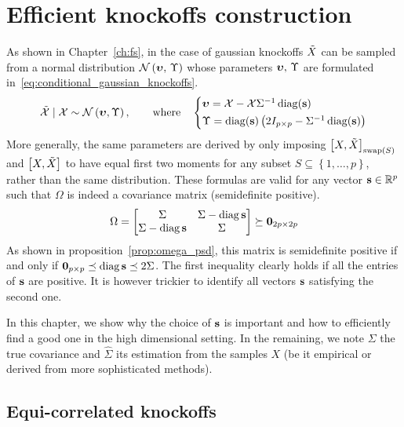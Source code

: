 \chapter{Efficient knockoffs construction}\label{ch:sdp}

As shown in Chapter~\ref{ch:fs}, in the case of gaussian knockoffs
$\tilde{X}$ can be sampled from a normal distribution $\mathcal{N}\left( \bm{\upsilon},\, \Upsilon \right)$ whose parameters
$\bm{\upsilon},\, \Upsilon$ are formulated in~\ref{eq:conditional_gaussian_knockoffs}.
\begin{equation}\label{eq:conditional_gaussian_knockoffs}
    \tcX \mid \cX \sim \cN\left( \bupsilon, \Upsilon \right)
    ,\qquad\text{where}\quad
    \begin{cases*}
        \bupsilon = \cX - \cX\Sigma^{-1}\diag(\bs)\\
        \Upsilon = \diag(\bs)\left( 2I_{p \times p} - \Sigma^{-1}\diag(\bs) \right)
    \end{cases*}
\end{equation}
More generally, the same parameters are derived by only imposing
$\big[ X, \tilde{X} \big]_{\operatorname{swap}\left( S \right)}$ and $\big[ X, \tilde{X} \big]$
to have equal first two moments
for any subset
$S \subseteq \left\{ 1, \dots, p \right\}$,
rather than the same distribution.
These formulas are valid for any vector $\mathbf{s} \in \mathbb{R}^p$ such that $\Omega$
is indeed a covariance matrix (semidefinite positive).
\begin{equation*}
    \Omega = \begin{bmatrix}
        \Sigma & \Sigma - \operatorname*{diag} \mathbf{s}\\
        \Sigma - \operatorname*{diag} \mathbf{s} & \Sigma
    \end{bmatrix}
    \succeq \mathbf{0}_{2p \times 2p}
\end{equation*}
As shown in proposition~\ref{prop:omega_psd},
this matrix is semidefinite positive if and only if $\mathbf{0}_{p \times p} \preceq \operatorname*{diag} \mathbf{s} \preceq 2 \Sigma$.
The first inequality clearly holds if all the entries of $\mathbf{s}$ are positive.
It is however trickier to identify all vectors $\mathbf{s}$ satisfying the second one.

In this chapter, we show why the choice of $\mathbf{s}$ is important and how to efficiently find a good one
in the high dimensional setting.
In the remaining, we note $\Sigma$ the true covariance and $\hat{\Sigma}$ its estimation from the samples $X$
(be it empirical or derived from more sophisticated methods).

\section{Equi-correlated knockoffs}\label{sec:equi}

